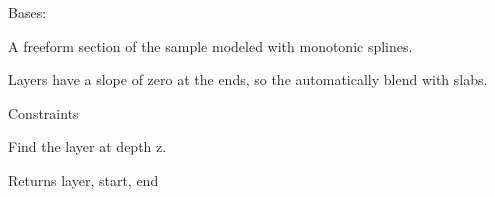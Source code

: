 \documentclass[letterpaper,10pt,english]{sphinxmanual}
\begin{document}
\begin{fulllineitems}
\label{api/mono:refl1d.mono.FreeInterface}
Bases: {\hyperref[api/model:refl1d.model.Layer]{}}

A freeform section of the sample modeled with monotonic splines.

Layers have a slope of zero at the ends, so the automatically blend
with slabs.

\begin{fulllineitems}
\label{api/mono:refl1d.mono.FreeInterface.constraints}
Constraints

\end{fulllineitems}


\begin{fulllineitems}
\label{api/mono:refl1d.mono.FreeInterface.find}
Find the layer at depth z.

Returns layer, start, end

\end{fulllineitems}


\begin{fulllineitems}
\label{api/mono:refl1d.mono.FreeInterface.parameters}
\end{fulllineitems}


\begin{fulllineitems}
\label{api/mono:refl1d.mono.FreeInterface.profile}
\end{fulllineitems}


\begin{fulllineitems}
\label{api/mono:refl1d.mono.FreeInterface.render}
\end{fulllineitems}


\end{fulllineitems}
\end{document}

